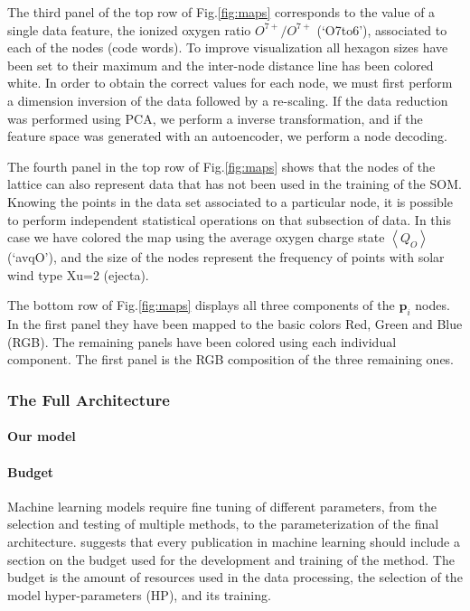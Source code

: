 The third panel of the top row of Fig.\ref{fig:maps} corresponds to the value of a single data feature, the ionized oxygen ratio $O^{7+}/O^{7+}$ (`O7to6'), associated to each of the nodes (code words). To improve visualization all hexagon sizes have been set to their maximum and the inter-node distance line has been colored white. In order to obtain the correct values for each node, we must first perform a dimension inversion of the data followed by a re-scaling. If the data reduction was performed using PCA, we perform a inverse transformation, and if the feature space was generated with an autoencoder, we perform a node decoding.

The fourth panel in the top row of Fig.\ref{fig:maps} shows that the nodes of the lattice can also represent data that has not been used in the training of the SOM. Knowing the points in the data set associated to a particular node, it is possible to perform independent statistical operations on that subsection of data. In this case we have colored the map using the average oxygen charge state $\left<Q_{O}\right>$ (`avqO'), and the size of the nodes represent the frequency of points with solar wind type Xu=2 (ejecta).

The bottom row of Fig.\ref{fig:maps} displays all three components of the $\boldsymbol{p}_i$ nodes. In the first panel they have been mapped to the basic colors Red, Green and Blue (RGB). The remaining panels have been colored using each individual component. The first panel is the RGB composition of the three remaining ones.

\subsubsection{The Full Architecture}

\paragraph{Our model}

\paragraph{Budget}
Machine learning models require fine tuning of different parameters, from the selection and testing of multiple methods, to the parameterization of the final architecture. \citep{[REF??]} suggests that every publication in machine learning should include a section on the budget used for the development and training of the method. The budget is the amount of resources used in the data processing, the selection of the model hyper-parameters (HP), and its training.

